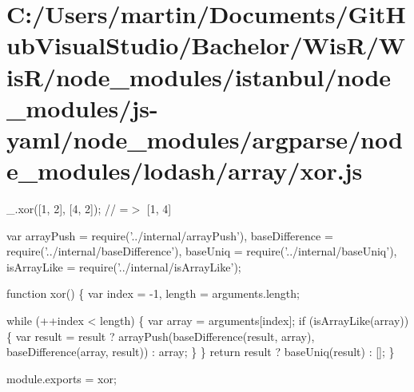 \hypertarget{_c_1_2_users_2martin_2_documents_2_git_hub_visual_studio_2_bachelor_2_wis_r_2_wis_r_2node_module529aac8bcb9ddbaeaf3fa32a1f314c2e}{}\section{C\+:/\+Users/martin/\+Documents/\+Git\+Hub\+Visual\+Studio/\+Bachelor/\+Wis\+R/\+Wis\+R/node\+\_\+modules/istanbul/node\+\_\+modules/js-\/yaml/node\+\_\+modules/argparse/node\+\_\+modules/lodash/array/xor.\+js}
\+\_\+.\+xor(\mbox{[}1, 2\mbox{]}, \mbox{[}4, 2\mbox{]}); // =$>$ \mbox{[}1, 4\mbox{]}


\begin{DoxyCodeInclude}
var arrayPush = require(\textcolor{stringliteral}{'../internal/arrayPush'}),
    baseDifference = require(\textcolor{stringliteral}{'../internal/baseDifference'}),
    baseUniq = require(\textcolor{stringliteral}{'../internal/baseUniq'}),
    isArrayLike = require(\textcolor{stringliteral}{'../internal/isArrayLike'});

\textcolor{keyword}{function} xor() \{
  var index = -1,
      length = arguments.length;

  \textcolor{keywordflow}{while} (++index < length) \{
    var array = arguments[index];
    \textcolor{keywordflow}{if} (isArrayLike(array)) \{
      var result = result
        ? arrayPush(baseDifference(result, array), baseDifference(array, result))
        : array;
    \}
  \}
  \textcolor{keywordflow}{return} result ? baseUniq(result) : [];
\}

module.exports = xor;
\end{DoxyCodeInclude}
 